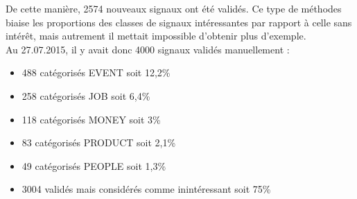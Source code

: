                 De cette manière, 2574 nouveaux signaux ont été validés. Ce type de méthodes biaise les proportions des classes de signaux intéressantes par rapport à celle sans intérêt, mais autrement il mettait impossible d'obtenir plus d'exemple.\\

                Au 27.07.2015, il y avait donc 4000 signaux validés manuellement :
                \begin{itemize}
                    \item 488 catégorisés EVENT soit 12,2\%
                    \item 258 catégorisés JOB soit 6,4\%
                    \item 118 catégorisés MONEY soit 3\%
                    \item 83 catégorisés PRODUCT soit 2,1\%
                    \item 49 catégorisés PEOPLE soit 1,3\%
                    \item 3004 validés mais considérés comme inintéressant soit 75\%
                \end{itemize}

